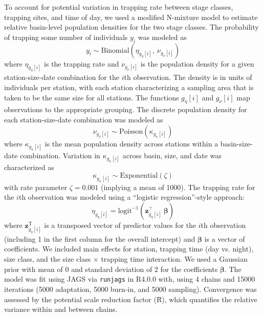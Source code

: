 \documentclass[11pt]{article}
\begin{document}
To account for potential variation in trapping rate between stage classes,
trapping sites, and time of day, 
we used a modified N-mixture model to estimate relative basin-level population densities
for the two stage classes.
The probability of trapping some number of individuals $y_i$ 
was modeled as
%
\begin{equation}
  y_i \sim \text{Binomial}\left(\eta_{g_{\eta}[i]}, ~\nu_{g_{\nu}[i]}\right)
\end{equation}
%
where $\eta_{g_{\eta}[i]}$ is the trapping rate 
and $\nu_{g_{\nu}[i]}$ is the population density for a given 
station-size-date combination for the $i$th observation.
The density is in units of individuals per station, 
with each station characterizing a sampling area that is 
taken to be the same size for all stations.
The functions ${g_{\eta}[i]}$ and ${g_{\nu}[i]}$ map observations to the 
appropriate grouping. 
The discrete population density for each station-size-date combination was modeled as
%
\begin{equation}
  \nu_{g_{\nu}[i]} \sim \text{Poisson}\left(\kappa_{g_{\kappa}[i]}\right)
\end{equation}
%
where $\kappa_{g_{\kappa}[i]}$ is the mean population density across stations 
within a basin-size-date combination. 
Variation in $\kappa_{g_{\kappa}[i]}$ across basin, size, 
and date was characterized as 
%
\begin{equation}
  \kappa_{g_{\kappa}[i]} \sim 
    \text{Exponential}\left(\zeta \right)
\end{equation}
%
with rate parameter $\zeta = 0.001$ (implying a mean of 1000).
The trapping rate for the $i$th observation was modeled using a 
``logistic regression''-style approach:
%
\begin{equation}
  \eta_{g_{\eta}[i]} = 
    \text{logit}^{-1}\left(\mathbf{z}_{g_{\eta}[i]}^\top~{\boldsymbol\beta}\right)
\end{equation}
%
\noindent where $\mathbf{z}_{g_{\eta}[i]}^\text{T}$ is a transposed vector 
of predictor values for the $i$th observation
(including 1 in the first column for the overall intercept)
and $\boldsymbol\beta$ is a vector of coefficients. 
We included main effects for station, trapping time (day vs. night), size class,
and the size class $\times$ trapping time interaction.
We used a Gaussian prior with mean of 0 and standard deviation of 2 
for the coefficients $\boldsymbol\beta$.
The model was fit using JAGS via \texttt{runjags} in R4.0.0 with,
using 4 chains and 15000 iterations (5000 adaptation, 5000 burn-in, and 5000 sampling).
Convergence was assessed by the potential scale reduction factor (\^{R}),
which quantifies the relative variance within and between chains. 
\end{document}

